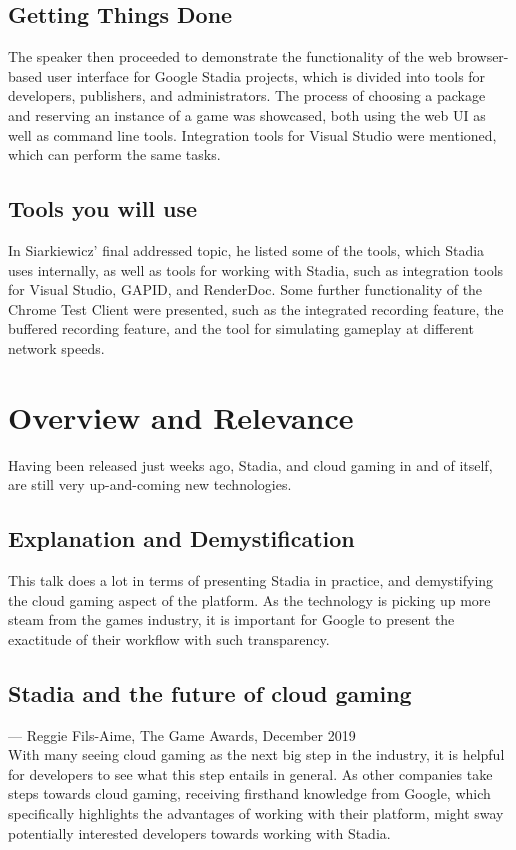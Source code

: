 \documentclass[a4paper]{article}
\begin{document}
\subsection{Getting Things Done}
The speaker then proceeded to demonstrate the functionality of the web browser-based user interface for Google Stadia projects, which is divided into tools for developers, publishers, and administrators. The process of choosing a package and reserving an instance of a game was showcased, both using the web UI as well as command line tools. Integration tools for Visual Studio were mentioned, which can perform the same tasks.

\subsection{Tools you will use}
In Siarkiewicz' final addressed topic, he listed some of the tools, which Stadia uses internally, as well as tools for working with Stadia, such as integration tools for Visual Studio, GAPID, and RenderDoc. Some further functionality of the Chrome Test Client were presented, such as the integrated recording feature, the buffered recording feature, and the tool for simulating gameplay at different network speeds.

\section{Overview and Relevance}
Having been released just weeks ago, Stadia, and cloud gaming in and of itself, are still very up-and-coming new technologies.
\subsection{Explanation and Demystification}
This talk does a lot in terms of presenting Stadia in practice, and demystifying the cloud gaming aspect of the platform. As the technology is picking up more steam from the games industry, it is important for Google to present the exactitude of their workflow with such transparency. 
\subsection{Stadia and the future of cloud gaming}
\cite{filsaime}\rm --- Reggie Fils-Aime, The Game Awards, December 2019 \newline\\
With many seeing cloud gaming as the next big step in the industry\cite{birise}, it is helpful for developers to see what this step entails in general. As other companies take steps towards cloud gaming\cite{bifacebook}, receiving firsthand knowledge from Google, which specifically highlights the advantages of working with their platform, might sway potentially interested developers towards working with Stadia.
\end{document}
